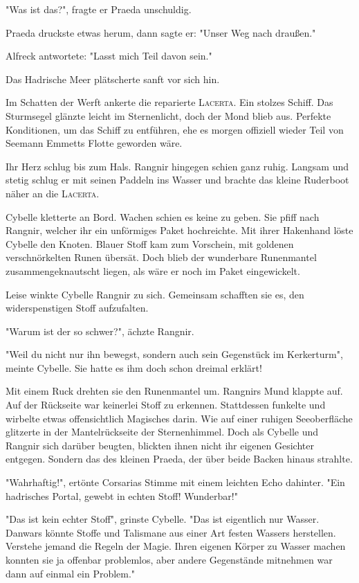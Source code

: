 "Was ist das?", fragte er Praeda unschuldig.

Praeda druckste etwas herum, dann sagte er: "Unser Weg nach draußen."

Alfreck antwortete: "Lasst mich Teil davon sein."

\trennzeichen

Das Hadrische Meer plätscherte sanft vor sich hin.

Im Schatten der Werft ankerte die reparierte \textsc{Lacerta}. Ein stolzes Schiff. Das Sturmsegel glänzte leicht im Sternenlicht, doch der Mond blieb aus. Perfekte Konditionen, um das Schiff zu entführen, ehe es morgen offiziell wieder Teil von Seemann Emmetts Flotte geworden wäre. 

Ihr Herz schlug bis zum Hals. Rangnir hingegen schien ganz ruhig. Langsam und stetig schlug er mit seinen Paddeln ins Wasser und brachte das kleine Ruderboot näher an die \textsc{Lacerta}. 

Cybelle kletterte an Bord. Wachen schien es keine zu geben. Sie pfiff nach Rangnir, welcher ihr ein unförmiges Paket hochreichte. Mit ihrer Hakenhand löste Cybelle den Knoten. Blauer Stoff kam zum Vorschein, mit goldenen verschnörkelten Runen übersät. Doch blieb der wunderbare Runenmantel zusammengeknautscht liegen, als wäre er noch im Paket eingewickelt.

Leise winkte Cybelle Rangnir zu sich. Gemeinsam schafften sie es, den widerspenstigen Stoff aufzufalten. 

"Warum ist der so schwer?", ächzte Rangnir.

"Weil du nicht nur ihn bewegst, sondern auch sein Gegenstück im Kerkerturm", meinte Cybelle. Sie hatte es ihm doch schon dreimal erklärt!

Mit einem Ruck drehten sie den Runenmantel um. Rangnirs Mund klappte auf. Auf der Rückseite war keinerlei Stoff zu erkennen. Stattdessen funkelte und wirbelte etwas offensichtlich Magisches darin. Wie auf einer ruhigen Seeoberfläche glitzerte in der Mantelrückseite der Sternenhimmel. Doch als Cybelle und Rangnir sich darüber beugten, blickten ihnen nicht ihr eigenen Gesichter entgegen. Sondern das des kleinen Praeda, der über beide Backen hinaus strahlte.

"Wahrhaftig!", ertönte Corsarias Stimme mit einem leichten Echo dahinter. "Ein hadrisches Portal, gewebt in echten Stoff! Wunderbar!"

"Das ist kein echter Stoff", grinste Cybelle. "Das ist eigentlich nur Wasser. Danwars  könnte Stoffe und Talismane aus einer Art festen Wassers herstellen. Verstehe jemand die Regeln der Magie. Ihren eigenen Körper zu Wasser machen konnten sie ja offenbar problemlos, aber andere Gegenstände mitnehmen war dann auf einmal ein Problem."  

